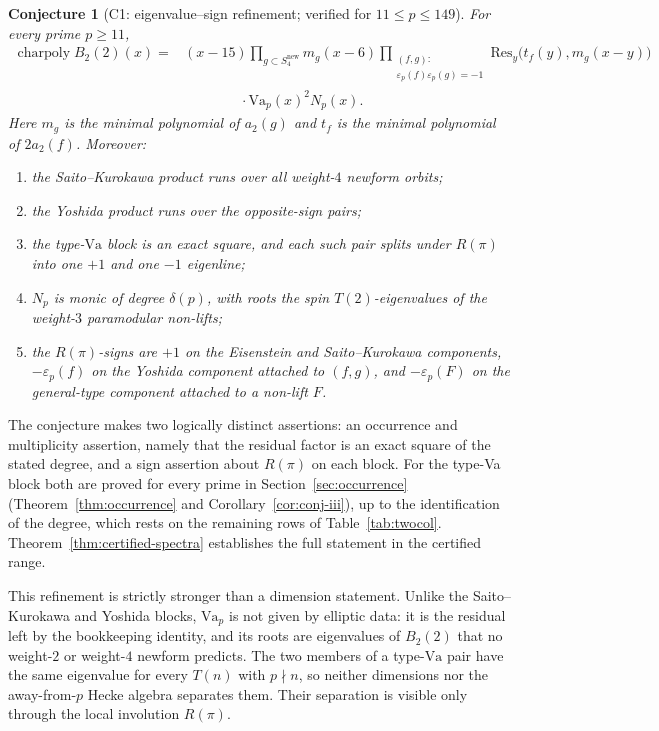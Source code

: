 \documentclass[10pt,a4paper]{amsart}
\newtheorem{conjecture}[theorem]{Conjecture}
\newcommand{\Res}{\mathrm{Res}}
\newcommand{\Va}{\mathrm{Va}}
\newcommand{\snew}{S^{\mathrm{new}}}
\newcommand{\eps}{\varepsilon}
\DeclareMathOperator{\charp}{charpoly}
\providecommand{\Va}{\mathrm{Va}}
\providecommand{\snew}{S^{\mathrm{new}}}
\providecommand{\charp}{\operatorname{charpoly}}
\begin{document}
	\begin{conjecture}[C1: eigenvalue--sign refinement; verified for $11\le p\le149$]
		\label{conj:eigenvalue-sign} \label{conj:refined}
		For every prime $p\ge11$,
		\begin{equation}\label{eq:C1-factorization}
			\begin{split}
				\charp B_2(2)(x)
				={}&(x-15)
				\prod_{g\subset\snew_4}m_g(x-6)
				\prod_{\substack{(f,g):\\ \eps_p(f)\eps_p(g)=-1}}
				\Res_y\bigl(t_f(y),m_g(x-y)\bigr)\\
				&\qquad\qquad\cdot \Va_p(x)^2N_p(x).
			\end{split}
		\end{equation}
		Here $m_g$ is the minimal polynomial of $a_2(g)$ and $t_f$ is the minimal
		polynomial of $2a_2(f)$. Moreover:
		\begin{enumerate}[label=\textup{(\roman*)},leftmargin=2.5em]
			\item the Saito--Kurokawa product runs over all weight-$4$ newform orbits;
			\item the Yoshida product runs over the opposite-sign pairs;
			\item the type-$\Va$ block is an exact square, and each such pair splits
			under $R(\pi)$ into one $+1$ and one $-1$ eigenline;
			\item $N_p$ is monic of degree $\delta(p)$, with roots the spin
			$T(2)$-eigenvalues of the weight-$3$ paramodular non-lifts;
			\item the $R(\pi)$-signs are $+1$ on the Eisenstein and
			Saito--Kurokawa components, $-\eps_p(f)$ on the Yoshida component attached
			to $(f,g)$, and $-\eps_p(F)$ on the general-type component attached to a
			non-lift $F$.
		\end{enumerate}
	\end{conjecture}
	
	The conjecture makes two logically distinct assertions: an occurrence and
	multiplicity assertion, namely that the residual factor is an exact square
	of the stated degree, and a sign assertion about $R(\pi)$ on each block.
	For the type-Va block both are proved for every prime in
	Section~\ref{sec:occurrence} (Theorem~\ref{thm:occurrence} and
	Corollary~\ref{cor:conj-iii}), up to the identification of the degree,
	which rests on the remaining rows of Table~\ref{tab:twocol}.
	Theorem~\ref{thm:certified-spectra} establishes the full statement in the
	certified range.
	
	This refinement is strictly stronger than a dimension statement. Unlike
	the Saito--Kurokawa and Yoshida blocks, $\Va_p$ is not given by elliptic
	data: it is the residual left by the bookkeeping identity, and its roots
	are eigenvalues of $B_2(2)$ that no weight-$2$ or weight-$4$ newform
	predicts. The two
	members of a type-$\Va$ pair have the same eigenvalue for every $T(n)$
	with $p\nmid n$, so neither dimensions nor the away-from-$p$ Hecke
	algebra separates them. Their separation is visible only through the local
	involution $R(\pi)$.
	
\end{document}

